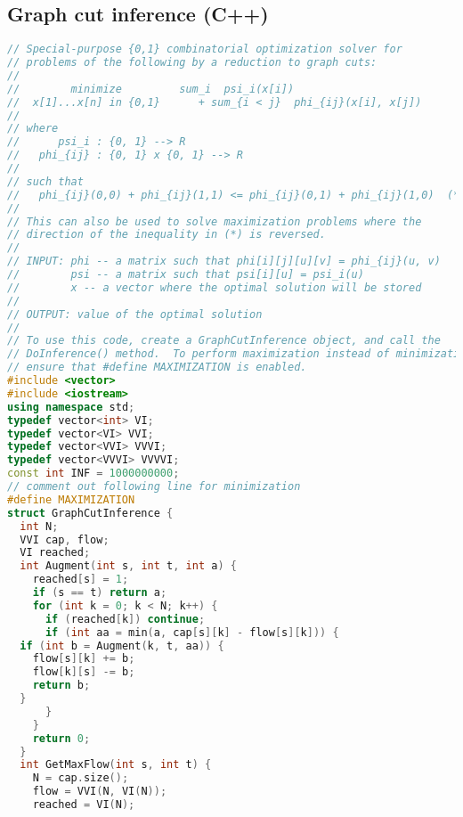 \subsection{Graph cut inference (C++)}
\begin{lstlisting}[language=C++]
// Special-purpose {0,1} combinatorial optimization solver for
// problems of the following by a reduction to graph cuts:
//
//        minimize         sum_i  psi_i(x[i]) 
//  x[1]...x[n] in {0,1}      + sum_{i < j}  phi_{ij}(x[i], x[j])
//
// where
//      psi_i : {0, 1} --> R
//   phi_{ij} : {0, 1} x {0, 1} --> R
//
// such that
//   phi_{ij}(0,0) + phi_{ij}(1,1) <= phi_{ij}(0,1) + phi_{ij}(1,0)  (*)
//
// This can also be used to solve maximization problems where the
// direction of the inequality in (*) is reversed.
//
// INPUT: phi -- a matrix such that phi[i][j][u][v] = phi_{ij}(u, v)
//        psi -- a matrix such that psi[i][u] = psi_i(u)
//        x -- a vector where the optimal solution will be stored
//
// OUTPUT: value of the optimal solution
//
// To use this code, create a GraphCutInference object, and call the
// DoInference() method.  To perform maximization instead of minimization,
// ensure that #define MAXIMIZATION is enabled.
#include <vector>
#include <iostream>
using namespace std;
typedef vector<int> VI;
typedef vector<VI> VVI;
typedef vector<VVI> VVVI;
typedef vector<VVVI> VVVVI;
const int INF = 1000000000;
// comment out following line for minimization
#define MAXIMIZATION
struct GraphCutInference {
  int N;
  VVI cap, flow;
  VI reached;
  int Augment(int s, int t, int a) {
    reached[s] = 1;
    if (s == t) return a; 
    for (int k = 0; k < N; k++) {
      if (reached[k]) continue;
      if (int aa = min(a, cap[s][k] - flow[s][k])) {
  if (int b = Augment(k, t, aa)) {
    flow[s][k] += b;
    flow[k][s] -= b;
    return b;
  }
      }
    }
    return 0;
  }
  int GetMaxFlow(int s, int t) {
    N = cap.size();
    flow = VVI(N, VI(N));
    reached = VI(N);
    

\end{lstlisting}
